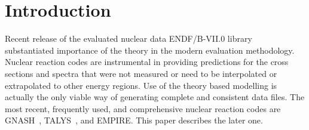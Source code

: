 \maketitle
\tableofcontents





\vspace*{12mm}  
  \lfoot{} \rfoot{} %
\setlength{\headrulewidth}{0.4pt} \setlength{\footrulewidth}{0.4pt}

%

\newpage

\section{Introduction}

Recent release of the evaluated nuclear data ENDF/B-VII.0 library~\cite%
{ENDF-VII} substantiated importance of the theory in the modern evaluation
methodology. Nuclear reaction codes are instrumental in providing
predictions for the cross sections and spectra that were not measured or
need to be interpolated or extrapolated to other energy regions. Use of the
theory based modelling is actually the only viable way of generating
complete and consistent data files. The most recent, frequently used, and
comprehensive nuclear reaction codes are GNASH~\cite{Young:77, Young:92,
Young:98}, TALYS~\cite{TALYS}, and EMPIRE. This paper describes the later
one.

